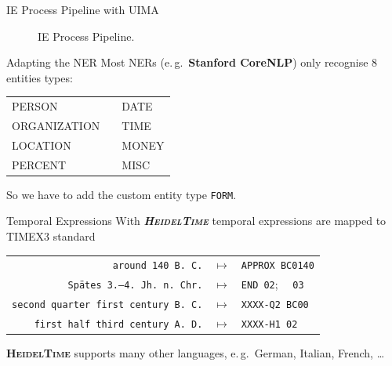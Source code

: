 \documentclass[xcolor=x11names, aspectratio=169,usenames,dvipsnames]{beamer}
\begin{document}
\begin{frame}{IE Process Pipeline with UIMA}
\begin{figure}
{
}
\caption{IE Process Pipeline.}
\end{figure}
\end{frame}

\begin{frame}[fragile]{Adapting the NER}\large
Most NERs (e.\,g.\ \textbf{Stanford CoreNLP}) only recognise 8 entities types:

\begin{center}\ttfamily
\begin{tabular}{lp{4em}l}
PERSON&&DATE\\
ORGANIZATION&&TIME\\
LOCATION&&MONEY\\
PERCENT&&MISC
\end{tabular}
\end{center}

So we have to add the \alert{custom entity type \texttt{FORM}}.
\end{frame}

\begin{frame}{Temporal Expressions}
With \textbf{\textit{\textsc{HeidelTime}}} temporal expressions are mapped to TIMEX3 standard
\begin{center}
{\renewcommand{\arraystretch}{1.2}%
\begin{tabular}{rcl}
\texttt{around 140 B.\,C.}&$\longmapsto$&\texttt{APPROX BC0140}\\
\texttt{Spätes 3.–4.\ Jh.\ n.\,Chr.}&$\longmapsto$&\texttt{END 02};~~ \texttt{03}\\
\texttt{second quarter first century B.\,C.}&$\longmapsto$&\texttt{XXXX-Q2 BC00}\\
\texttt{first half third century A.\,D.}&$\longmapsto$&\texttt{XXXX-H1 02}\\
\end{tabular}
}
\end{center}

\textbf{\textsc{HeidelTime}} supports many other languages, e.\,g.\ German, Italian, French, \dots
\end{frame}
\end{document}
